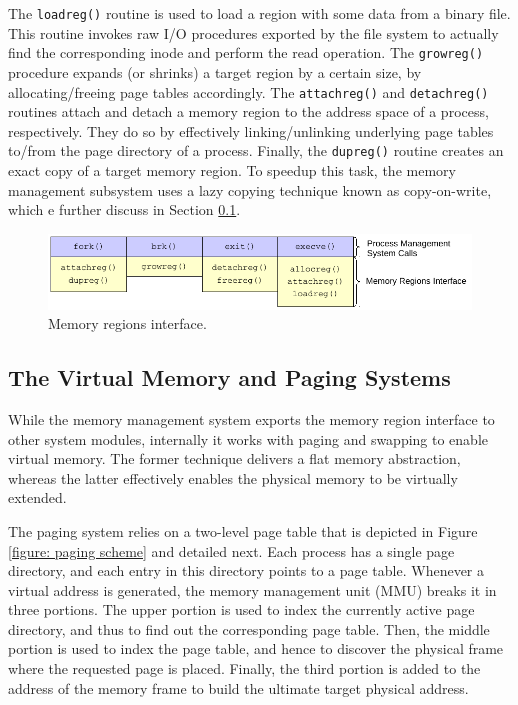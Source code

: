 \documentclass[10pt,a4paper]{article}
\begin{document}
The \texttt{loadreg()} routine is used to load a region with some data from a binary file. This routine invokes raw I/O procedures exported by the file system to actually find the corresponding inode and perform the read operation. The \texttt{growreg()} procedure expands (or shrinks) a target region by a certain size, by allocating/freeing page tables accordingly. The \texttt{attachreg()} and \texttt{detachreg()} routines attach and detach a memory region to the address space of a process, respectively. They do so by effectively linking/unlinking underlying page tables to/from the page directory of a process. Finally, the \texttt{dupreg()} routine creates an exact copy of a target memory region. To speedup this task, the memory management subsystem uses a lazy copying technique known as copy-on-write, which e further discuss in Section \ref{subsection: the virtual memory and paging systems}.

\begin{figure}[!t]
	\centering
	\includegraphics[scale=0.8]{img/memory-regions-interface}
	\caption{Memory regions interface.}
	\label{figure: memory regions interface}
\end{figure}

\subsection{The Virtual Memory and Paging Systems}
\label{subsection: the virtual memory and paging systems}

While the memory management system exports the memory region interface to other system modules, internally it works with paging and swapping to enable virtual memory. The former technique delivers a flat memory abstraction, whereas the latter effectively enables the physical memory to be virtually extended.

The paging system relies on a two-level page table that is depicted in Figure \ref{figure: paging scheme} and detailed next. Each process has a single page directory, and each entry in this directory points to a page table. Whenever a virtual address is generated, the memory management unit (MMU) breaks it in three portions. The upper portion is used to index the currently active page directory, and thus to find out the corresponding page table. Then, the middle portion is used to index the page table, and hence to discover the physical frame where the requested page is placed. Finally, the third portion is added to the address of the memory frame to build the ultimate target physical address.
\end{document}
